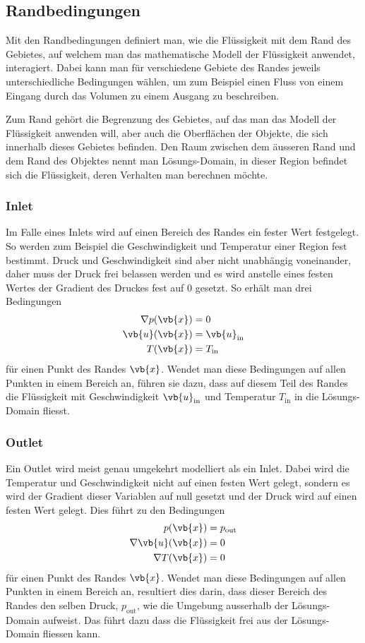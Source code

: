 \subsection{Randbedingungen}
\label{openfoam:randbedingungen}
Mit den Randbedingungen definiert man, wie die Flüssigkeit mit dem Rand des Gebietes, auf welchem man das mathematische Modell der Flüssigkeit anwendet, interagiert.
Dabei kann man für verschiedene Gebiete des Randes jeweils unterschiedliche Bedingungen wählen, um zum Beispiel einen Fluss von einem Eingang durch das Volumen zu einem Ausgang zu beschreiben.

Zum Rand gehört die Begrenzung des Gebietes, auf das man das Modell der Flüssigkeit anwenden will, aber auch die Oberflächen der Objekte, die sich innerhalb dieses Gebietes befinden.
Den Raum zwischen dem äusseren Rand und dem Rand des Objektes nennt man Lösungs-Domain, in dieser Region befindet sich die Flüssigkeit, deren Verhalten man berechnen möchte.

\subsubsection{Inlet}
Im Falle eines Inlets wird auf einen Bereich des Randes ein fester Wert festgelegt. 
So werden zum Beispiel die Geschwindigkeit und Temperatur einer Region fest bestimmt.
Druck und Geschwindigkeit sind aber nicht unabhängig voneinander, daher muss der Druck frei belassen werden und es wird anstelle eines festen Wertes der Gradient des Druckes fest auf 0 gesetzt.
So erhält man drei Bedingungen 
\begin{align*}
 \nabla p(\vb{x}) &= 0 \\
 \vb{u}(\vb{x}) &= \vb{u}_{\text{in}} \\
 T(\vb{x}) &= T_{\text{in}}
\end{align*}
für einen Punkt des Randes $\vb{x}$.
Wendet man diese Bedingungen auf allen Punkten in einem Bereich an, führen sie dazu, dass auf diesem Teil des Randes die Flüssigkeit mit Geschwindigkeit $\vb{u}_{\text{in}}$ und Temperatur $T_{\text{in}}$ in die Lösungs-Domain fliesst.

\subsubsection{Outlet}
Ein Outlet wird meist genau umgekehrt modelliert als ein Inlet.
Dabei wird die Temperatur und Geschwindigkeit nicht auf einen festen Wert gelegt, sondern es wird der Gradient dieser Variablen auf null gesetzt und der Druck wird auf einen festen Wert gelegt.
Dies führt zu den Bedingungen
\begin{align*}
 p(\vb{x}) &= p_{\text{out}} \\
 \nabla\vb{u}(\vb{x}) &= 0 \\
 \nabla T(\vb{x}) &= 0
\end{align*}
für einen Punkt des Randes $\vb{x}$.
Wendet man diese Bedingungen auf allen Punkten in einem Bereich an, resultiert dies darin, dass dieser Bereich des Randes den selben Druck, $p_{\text{out}}$,  wie die Umgebung ausserhalb der Lösungs-Domain aufweist.
Das führt dazu dass die Flüssigkeit frei aus der Lösungs-Domain fliessen kann.

